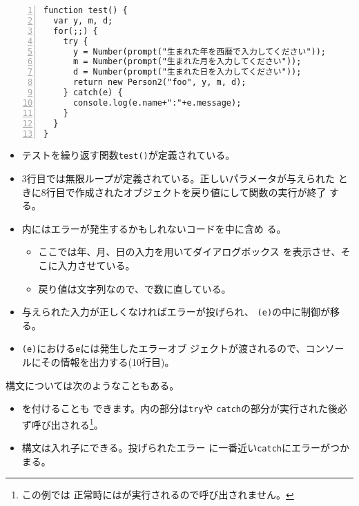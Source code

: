 \begin{Verbatim}[numbers=left]
function test() {
  var y, m, d;
  for(;;) {
    try {
      y = Number(prompt("生まれた年を西暦で入力してください"));
      m = Number(prompt("生まれた月を入力してください"));
      d = Number(prompt("生まれた日を入力してください"));
      return new Person2("foo", y, m, d);
    } catch(e) {
      console.log(e.name+":"+e.message);
    }
  }
}
\end{Verbatim}
\begin{itemize}
 \item テストを繰り返す関数\texttt{test()}が定義されている。
 \item 3行目では無限ループが定義されている。正しいパラメータが与えられた
			 ときに8行目で作成されたオブジェクトを戻り値にして関数の実行が終了
			 する。
 \item {}内にはエラーが発生するかもしれないコードを中に含め
			 る。
	\begin{itemize}
	 \item ここでは年、月、日の入力を用いてダイアログボックス
				 を表示させ、そこに入力させている。
	 \item 戻り値は文字列なので、で数に直している。
	\end{itemize}
 \item 与えられた入力が正しくなければエラーが投げられ、
			 \texttt{(e)}の中に制御が移る。
 \item {}\texttt{(e)}における\texttt{e}には発生したエラーオブ
			 ジェクトが渡されるので、コンソールにその情報を出力する(10行目)。
\end{itemize}
構文については次のようなこともある。
\begin{itemize}
 \item {}を付けることも
できます。内の部分は\texttt{try}や
\texttt{catch}の部分が実行された後必ず呼び出される\footnote{この例では
正常時にはが実行されるので呼び出されません。}。
 \item {}構文は入れ子にできる。投げられたエラー
			 に一番近い\texttt{catch}にエラーがつかまる。
\end{itemize}
